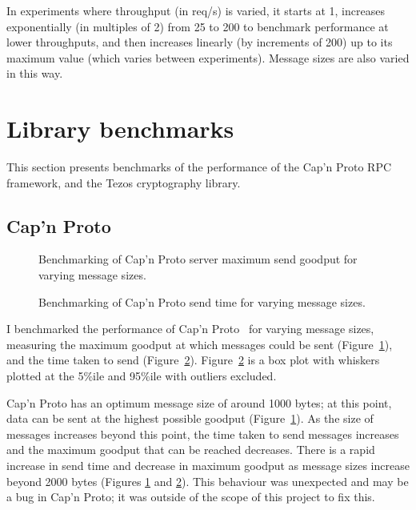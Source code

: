 In experiments where throughput (in req/s) is varied, it starts at 1, increases exponentially (in multiples of 2) from 25 to 200 to benchmark performance at lower throughputs, and then increases linearly (by increments of 200) up to its maximum value (which varies between experiments). Message sizes are also varied in this way.

\section{Library benchmarks} \label{librarybenchmarks}
This section presents benchmarks of the performance of the Cap'n Proto RPC framework, and the Tezos cryptography library.

\subsection{Cap'n Proto} \label{capnpbenchmark}

\begin{figure}[h!]
\centering
\resizebox{.6\textwidth}{!}{}
\caption{Benchmarking of Cap'n Proto server maximum send goodput for varying message sizes.}
\label{sizegoodput}
\end{figure}

\begin{figure}[h!]
\centering
\resizebox{.6\textwidth}{!}{}
\caption{Benchmarking of Cap'n Proto send time for varying message sizes.}
\label{sizesendtime}
\end{figure}

I benchmarked the performance of Cap'n Proto~\cite{capnp} for varying message sizes, measuring the maximum goodput at which messages could be sent (Figure~\ref{sizegoodput}), and the time taken to send (Figure~\ref{sizesendtime}). Figure~\ref{sizesendtime} is a box plot with whiskers plotted at the 5\%ile and 95\%ile with outliers excluded.

Cap'n Proto has an optimum message size of around 1000 bytes; at this point, data can be sent at the highest possible goodput (Figure~\ref{sizegoodput}). As the size of messages increases beyond this point, the time taken to send messages increases and the maximum goodput that can be reached decreases. There is a rapid increase in send time and decrease in maximum goodput as message sizes increase beyond 2000 bytes (Figures \ref{sizegoodput} and \ref{sizesendtime}). This behaviour was unexpected and may be a bug in Cap'n Proto; it was outside of the scope of this project to fix this.

